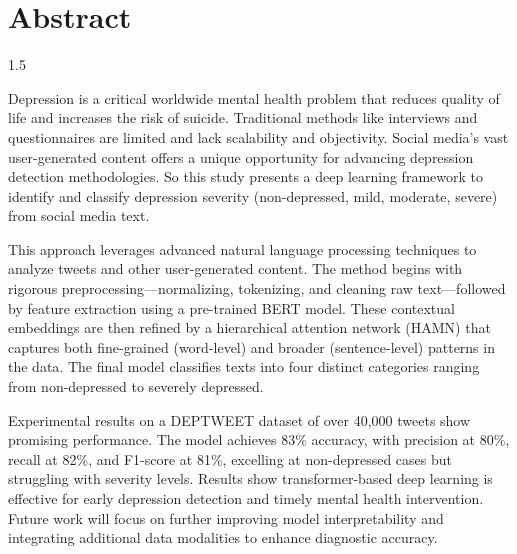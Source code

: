 \chapter*{Abstract}
\begin{spacing}{1.5}
	
	Depression is a critical worldwide mental health problem that reduces quality of life and increases the risk of suicide. Traditional methods like interviews and questionnaires are limited and lack scalability and objectivity. Social media's vast user-generated content offers a unique opportunity for advancing depression detection methodologies. So this study presents a deep learning framework to identify and classify depression severity (non-depressed, mild, moderate, severe) from social media text. 
	
	This approach leverages advanced natural language processing techniques to analyze tweets and other user-generated content. The method begins with rigorous preprocessing—normalizing, tokenizing, and cleaning raw text—followed by feature extraction using a pre-trained BERT model. These contextual embeddings are then refined by a hierarchical attention network (HAMN) that captures both fine-grained (word-level) and broader (sentence-level) patterns in the data. The final model classifies texts into four distinct categories ranging from non-depressed to severely depressed. 
	
	Experimental results on a DEPTWEET dataset of over 40,000 tweets show promising performance. The model achieves 83\% accuracy, with precision at 80\%, recall at 82\%, and F1-score at 81\%, excelling at non-depressed cases but struggling with severity levels. Results show transformer-based deep learning is effective for early depression detection and timely mental health intervention. Future work will focus on further improving model interpretability and integrating additional data modalities to enhance diagnostic accuracy.
	
\end{spacing}